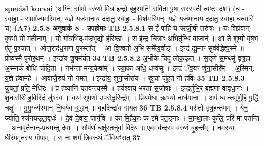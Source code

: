 \documentclass[17pt]{extarticle}
\begin{document}
                  \newline
                                                        \textbf{special korvai} \newline
              (अ॒ग्निः सोमो॒ वरु॑णो मि॒त्र इन्द्रो॒ बृह॒स्पतिः॑ सवि॒ता पू॒षा सरस्वती॒ त्वष्टा॒ दश॑) \newline
                                (च - स्वाहा॒ - साम्रा᳚ज्यम॒स्मिन्. य॒ज्ञे यज॑मानाय ददातु॒ स्वाहा॒ - विश॑म॒स्मिन्. य॒ज्ञे यज॑मानाय ददातु॒ स्वाहा॑ च॒त्वारि॑ च) \textbf{(A7)} \newline \newline
                \textbf{ 2.5.8     अनुवाकं   8 -  उपहोमाः} \newline
                                \textbf{ TB 2.5.8.1} \newline
                  स ईं᳚ पाहि॒ य ऋ॑जी॒षी तरु॑त्रः । यः शिप्र॑वान् वृष॒भो यो म॑ती॒नाम् । यो गो᳚त्र॒भिद्-व॑ज्र॒भृद्यो ह॑रि॒ष्ठाः । स इ॑न्द्र चि॒त्राꣳ अ॒भितृ॑न्धि॒ वाजान्॑ ॥ आ ते॒ शुष्मो॑ वृष॒भ ए॑तु प॒श्चात् । ओत्त॒राद॑ध॒रागा पु॒रस्ता᳚त् । आ वि॒श्वतो॑ अ॒भि समे᳚त्व॒र्वाङ् । इन्द्र॑ द्यु॒म्नꣳ सुव॑र्वद्धेह्य॒स्मे ॥ प्रोष्व॑स्मै पुरोर॒थम् । इन्द्रा॑य शू॒षम॑र्चत \textbf{ 34} \newline
                  \newline
                                \textbf{ TB 2.5.8.2} \newline
                  अ॒भीके॑ चिदु लोक॒कृत् । स॒ङ्गे स॒मथ्सु॑ वृत्र॒हा । अ॒स्माकं॑ बोधि चोदि॒ता । नभ॑न्ता-मन्य॒केषा᳚म् । ज्या॒का अधि॒ धन्व॑सु ॥ इन्द्रं॑ ॅव॒यꣳ शु॑ना॒सीर᳚म् । अ॒स्मिन्. य॒ज्ञे ह॑वामहे । आवाजै॒रुप॑ नो गमत् ॥ इन्द्रा॑य॒ शुना॒सीरा॑य । स्रु॒चा जु॑हुत नो ह॒विः \textbf{ 35} \newline
                  \newline
                                \textbf{ TB 2.5.8.3} \newline
                  जु॒षतां॒ प्रति॒ मेधि॑रः ॥ प्र ह॒व्यानि॑ घृ॒तव॑न्त्यस्मै । हर्य॑श्वाय भरता स॒जोषाः᳚ । इन्द्र॒र्तुभि॒र् ब्रह्म॑णा वावृधा॒नः । शु॒ना॒सी॒री ह॒विरि॒दं जु॑षस्व ॥ वयः॑ सुप॒र्णा उप॑सेदु॒रिन्द्र᳚म् । प्रि॒यमे॑धा॒ ऋष॑यो॒ नाध॑मानाः । अप॑ ध्वा॒न्तमू᳚र्णु॒हि पू॒र्द्धि चक्षुः॑ । मु॒मु॒ग्ध्य॑स्मान् नि॒धये॑व ब॒द्धान् ॥ बृ॒हदिन्द्रा॑य गायत \textbf{ 36} \newline
                  \newline
                                \textbf{ TB 2.5.8.4} \newline
                  मरु॑तो वृत्र॒हन्त॑मम् । येन॒ ज्योति॒-रज॑नयन्नृता॒वृधः॑ । दे॒वं दे॒वाय॒ जागृ॑वि ॥ का मि॒हैकाः॒ क इ॒मे प॑त॒ङ्गाः । मा॒न्था॒लाः कुलि॒ परि॑ मा पतन्ति । अना॑वृतैना॒न्-प्रध॑मन्तु दे॒वाः । सौप॑र्णं॒ चक्षु॑स्त॒नुवा॑ विदेय ॥ ए॒वा व॑न्दस्व॒ वरु॑णं बृ॒हन्त᳚म् । न॒म॒स्या धीर॑म॒मृत॑स्य गो॒पाम् । स नः॒ शर्म॑ त्रि॒वरू॑थं॒ ॅवियꣳ॑सत् \textbf{ 37} \newline
\end{document}
